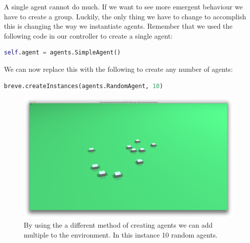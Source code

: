 A single agent cannot do much. If we want to see more emergent behaviour we have to create a group. Luckily, the only thing we have to change to accomplish this is changing the way we instantiate agents. Remember that we used the following code in our controller to create a single agent:

\begin{lstlisting}[language=Python]
self.agent = agents.SimpleAgent()
\end{lstlisting}

We can now replace this with the following to create any number of agents:

\begin{lstlisting}[language=Python]
breve.createInstances(agents.RandomAgent, 10)
\end{lstlisting}


\begin{figure}[htbp]
\begin{center}
\includegraphics{graphics/randomagents}
\caption{By using the a different method of creating agents we can add multiple to the environment. In this instance 10 random agents.}
\end{center}
\end{figure}

